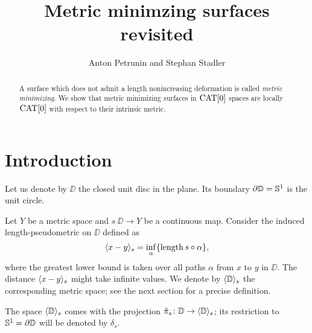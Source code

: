 \documentclass{article}
\begin{document}
\title{Metric minimzing surfaces revisited}
\author{Anton Petrunin and Stephan Stadler}

\newcommand{\Addresses}{{\bigskip\footnotesize
Anton Petrunin, \par\nopagebreak\textsc{Department of Mathematics, PSU, University Park, PA 16802, USA}
\par\nopagebreak
\textit{Email}: \texttt{petrunin@math.psu.edu}

\medskip
 
Stephan Stadler,
\par\nopagebreak\textsc{Mathematisches Institut der Universit\"at M\"unchen, Theresienstr. 39, D-80333 M\"unchen, Germany}
\par\nopagebreak
\textit{Email}: \texttt{stadler@math.lmu.de}
}}

\date{}


\maketitle

\begin{abstract}
A surface which does not admit a length nonincreasing deformation is called \emph{metric minimizing}.
We show that metric minimizing surfaces in $\mathop{\rm CAT}\nolimits[0]$ spaces are locally $\mathop{\rm CAT}\nolimits[0]$ with respect to their intrinsic metric. 
\end{abstract}

\section{Introduction}

Let us denote by $\DD$ the closed unit disc in the plane.
Its boundary $\partial \mathbb{D}=\mathbb{S}^1$ is the unit circle.

Let $Y$ be a metric space
and $s\:\DD\to Y$ be a continuous map.
Consider the induced length-pseudometric on $\DD$ defined as 
\[\langle x-y\rangle_s=\inf_\alpha\{\mathop{\rm length}\nolimits s\circ\alpha\},\]
where the greatest lower bound is taken over all paths $\alpha$ from $x$ to $y$ in $\DD$.
The distance $\langle x-y\rangle_s$ might take infinite values.
We denote by $\langle\mathbb{D}\rangle_s$ the corresponding metric space;
see the next section for a precise definition.

The space $\langle\mathbb{D}\rangle_s$ comes with the projection $ \hat\pi_s\colon\mathbb{D}\to\langle\mathbb{D}\rangle_s$;
its restriction to $\mathbb{S}^1=\partial\mathbb{D}$ will be denoted by $\delta_s$.
\end{document}
